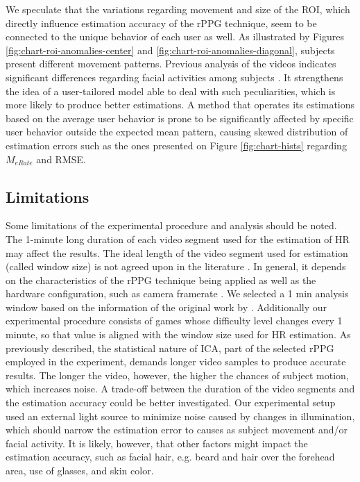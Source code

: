 We speculate that the variations regarding movement and size of the ROI, which directly influence estimation accuracy of the rPPG technique, seem to be connected to the unique behavior of each user as well. As illustrated by Figures \ref{fig:chart-roi-anomalies-center} and \ref{fig:chart-roi-anomalies-diagonal}, subjects present different movement patterns. Previous analysis of the videos indicates significant differences regarding facial activities among subjects \parencite{bevilacqua2016variations}. It strengthens the idea of a user-tailored model able to deal with such peculiarities, which is more likely to produce better estimations. A method that operates its estimations based on the average user behavior is prone to be significantly affected by specific user behavior outside the expected mean pattern, causing skewed distribution of estimation errors such as the ones presented on Figure \ref{fig:chart-hists} regarding $M_{eRate}$ and RMSE.

\subsection{Limitations}

Some limitations of the experimental procedure and analysis should be noted. The 1-minute long duration of each video segment used for the estimation of HR may affect the results. The ideal length of the video segment used for estimation (called window size) is not agreed upon in the literature \parencite{rouast2016remote}. In general, it depends on the characteristics of the rPPG technique being applied as well as the hardware configuration, such as camera framerate \parencite{roald2013estimation}. We selected a 1 min analysis window based on the information of the original work by \textcite{poh2011advancements}. Additionally our experimental procedure consists of games whose difficulty level changes every 1 minute, so that value is aligned with the window size used for HR estimation. As previously described, the statistical nature of ICA, part of the selected rPPG employed in the experiment, demands longer video samples to produce accurate results. The longer the video, however, the higher the chances of subject motion, which increases noise. A trade-off between the duration of the video segments and the estimation accuracy could be better investigated. Our experimental setup used an external light source to minimize noise caused by changes in illumination, which should narrow the estimation error to causes as subject movement and/or facial activity. It is likely, however, that other factors might impact the estimation accuracy, such as facial hair, e.g. beard and hair over the forehead area, use of glasses, and skin color.

